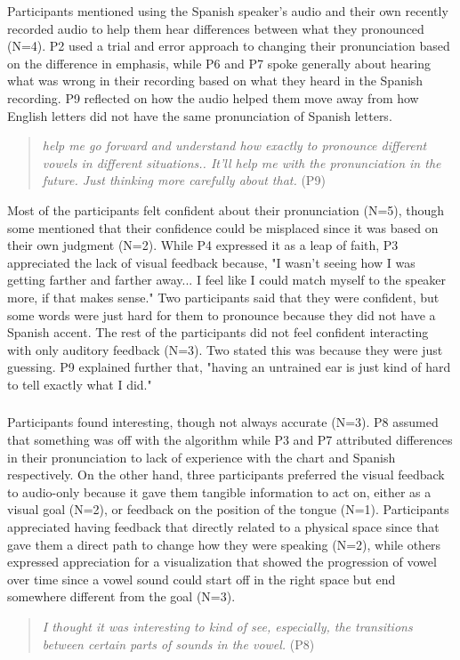 Participants mentioned using the Spanish speaker's audio and their own recently recorded audio to help them hear differences between what they pronounced (N=4). P2 used a trial and error approach to changing their pronunciation based on the difference in emphasis, while P6 and P7 spoke generally about hearing what was wrong in their recording based on what they heard in the Spanish recording. P9 reflected on how the audio helped them move away from how English letters did not have the same pronunciation of Spanish letters.

\begin{quote}
    \textit{\visowel{} help me go forward and understand how exactly to pronounce different vowels in different situations.. It'll help me with the pronunciation in the future. Just thinking more carefully about that.} (P9)
\end{quote} 

Most of the participants felt confident about their pronunciation (N=5), though some mentioned that their confidence could be misplaced since it was based on their own judgment (N=2). While P4 expressed it as a leap of faith, P3 appreciated the lack of visual feedback because, "I wasn't seeing how I was getting farther and farther away... I feel like I could match myself to the speaker more, if that makes sense." Two participants said that they were confident, but some words were just hard for them to pronounce because they did not have a Spanish accent. The rest of the participants did not feel confident interacting with only auditory feedback (N=3). Two stated this was because they were just guessing. P9 explained further that, "having an untrained ear is just kind of hard to tell exactly what I did." 

\subsubsection{\visowel{}}
Participants found \visowel{} interesting, though not always accurate (N=3). P8 assumed that something was off with the algorithm while P3 and P7 attributed differences in their pronunciation to lack of experience with the chart and Spanish respectively. On the other hand, three participants preferred the visual feedback to audio-only because it gave them tangible information to act on, either as a visual goal (N=2), or feedback on the position of the tongue (N=1). Participants appreciated having feedback that directly related to a physical space since that gave them a direct path to change how they were speaking (N=2), while others expressed appreciation for a visualization that showed the progression of vowel over time since a vowel sound could start off in the right space but end somewhere different from the goal (N=3). 
\begin{quote}
    \textit{I thought it was interesting to kind of see, especially, the transitions between certain parts of sounds in the vowel.} (P8)
\end{quote}

